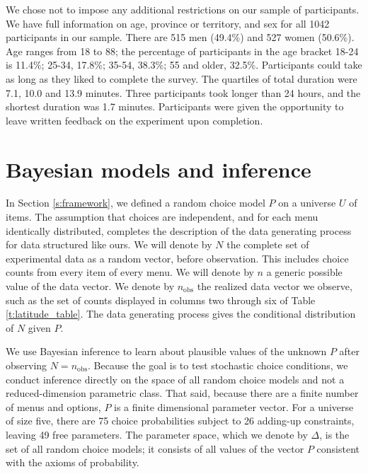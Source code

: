 \documentclass[11pt,letter]{article}
\newcommand{\menu}{menu}
\newcommand{\menus}{menus}
\begin{document}
We chose not to impose any additional restrictions on our sample of participants.
We have full information on age, province or territory, and sex for all 1042 participants in our sample.
There are 515 men (49.4\%) and 527 women (50.6\%).
Age ranges from 18 to 88; the percentage of participants in the age bracket 18-24 is 11.4\%; 25-34, 17.8\%; 35-54, 38.3\%; 55 and older, 32.5\%.
Participants could take as long as they liked to complete the survey.
The quartiles of total duration were 7.1, 10.0 and 13.9 minutes.
Three participants took longer than 24 hours, and the shortest duration was 1.7 minutes.
Participants were given the opportunity to leave written feedback on the experiment upon completion.

\section{Bayesian models and inference}\label{s:models}

In Section \ref{s:framework}, we defined a random choice model $P$ on a universe $U$ of items.
The assumption that choices are independent, and for each \menu{} identically distributed, completes the description of the data generating process for data structured like ours.
We will denote by $N$ the complete set of experimental data as a random vector, before observation.
This includes choice counts from every item of every \menu{}.
We will denote by $n$ a generic possible value of the data vector.
We denote by $n_{\mathrm{obs}}$ the realized data vector we observe, such as the set of counts displayed in columns two through six of Table \ref{t:latitude_table}.
The data generating process gives the conditional distribution of $N$ given $P$.

We use Bayesian inference to learn about plausible values of the unknown $P$ after observing $N = n_{\mathrm{obs}}$.
Because the goal is to test stochastic choice conditions, we conduct inference directly on the space of all random choice models and not a reduced-dimension parametric class.
That said, because there are a finite number of \menus{} and options, $P$ is a finite dimensional parameter vector.
For a universe of size five, there are 75 choice probabilities subject to 26 adding-up constraints, leaving 49 free parameters.
The parameter space, which we denote by $\Delta$, is the set of all random choice models; it consists of all values of the vector $P$ consistent with the axioms of probability.
\end{document}
